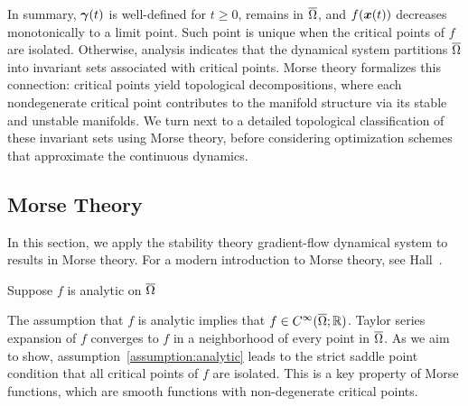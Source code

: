 \documentclass[10pt]{article}
\begin{document}
        \medskip

        In summary, $\bm{\gamma}(t)$ is well-defined for $t \ge 0$, remains in $\overline{\Omega}$, 
        and $f(\bm{x}(t))$ decreases monotonically to a limit point. Such point is unique
        when the critical points of $f$ are isolated. Otherwise, analysis indicates that 
        the dynamical system partitions $\overline{\Omega}$ into invariant sets associated 
        with critical points. Morse theory formalizes this connection: critical points yield 
        topological decompositions, where each nondegenerate critical point contributes to 
        the manifold structure via its stable and unstable manifolds. We turn next 
        to a detailed topological classification of these invariant sets using Morse theory, 
        before considering optimization schemes that approximate the 
        continuous dynamics.

        \bigskip

    \subsection{Morse Theory}
        \label{intro:morse}

        \medskip

        In this section, we apply the stability theory gradient-flow dynamical 
        system to results in Morse theory. For a modern introduction to Morse theory, see Hall~\cite{HallMorseNotes}.
        
        \medskip
        
        \begin{assumption}
            \label{assumption:analytic}
            Suppose $f$ is analytic on $\overline{\Omega}$
        \end{assumption}

        \medskip

        The assumption that $f$ is analytic implies that $f \in C^\infty(\overline{\Omega}; \mathbb{R})$.
        Taylor series expansion of $f$ converges to $f$ in a neighborhood of every point 
        in $\overline{\Omega}$. As we aim to show, assumption~\ref{assumption:analytic}
        leads to the strict saddle point condition that all critical points of $f$ are isolated.
        This is a key property of Morse functions, which are smooth functions with non-degenerate critical points.

        \medskip
        
\end{document}
